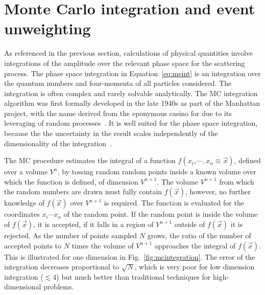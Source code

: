 \section{Monte Carlo integration and event unweighting}

As referenced in the previous section, calculations of physical
quantities involve integrations of the amplitude over the relevant phase space
for the scattering process. 
The phase space integration in Equation~\ref{eq:meint}
is an integration over the quantum numbers and four-momenta of all particles 
considered. The integration is often complex and rarely solvable analytically.
The MC integration algorithm
was first formally developed in the late 1940s as part of the Manhattan project,
with the name derived from the eponymous casino for due to its leveraging
of random processes~\cite{10.2307/2280232}.
It is well suited for the phase space integration, because the
the uncertainty in the result scales independently of the dimensionality 
of the integration~\cite{doi:10.1002/wics.1314}. 

The MC procedure estimates 
the integral of a function $f(x_{i},\cdots,x_n\equiv\vec{x})$, defined over a volume $V^{n}$,
by tossing random random points inside a known volume
over which the function is defined, of dimension $V^{n+1}$. The volume $V^{n+1}$
from which the random numbers are drawn must fully contain 
$f(\vec{x})$, however, no further knowledge of $f(\vec{x})$ over $V^{n+1}$ is required. The function
is evaluated for the coordinates $x_i\cdots x_n$ of the random point.
If the random point is inside the volume of $f(\vec{x})$, it is accepted,
if it falls in a region of $V^{n+1}$ outside of $f(\vec{x})$ it is rejected.
As the number of points sampled $N$ grows, the ratio of the number of accepted
points to $N$ times the volume of $V^{n+1}$ approaches the integral of $f(\vec{x})$.
This is illustrated for one dimension in Fig.~\ref{fig:mcintegration}.
The error of the integration decreases proportional to $\sqrt{N}$, which
is very poor for low dimension integration ($\lesssim$4) but much better than
traditional techniques for high-dimensional problems.

